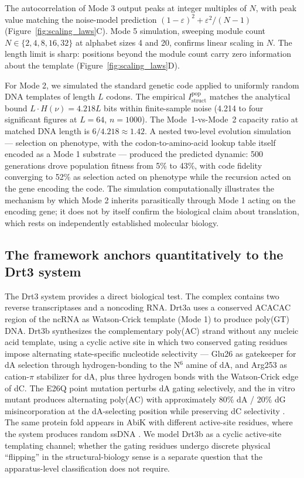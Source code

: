 \documentclass[aps,prx,reprint,amsmath,amssymb,floatfix,superscriptaddress,nofootinbib]{revtex4-2}
\theoremstyle{plain-thm}
\theoremstyle{definition-thm}
\newcommand{\Istructpop}{I_{\mathrm{struct}}^{\mathrm{pop}}}
\begin{document}
The autocorrelation of Mode 3 output peaks at integer multiples of $N$, with peak value matching the noise-model prediction $(1 - \varepsilon)^2 + \varepsilon^2/(N - 1)$ (Figure~\ref{fig:scaling_laws}C). Mode 5 simulation, sweeping module count $N \in \{2, 4, 8, 16, 32\}$ at alphabet sizes 4 and 20, confirms linear scaling in $N$. The length limit is sharp: positions beyond the module count carry zero information about the template (Figure~\ref{fig:scaling_laws}D).

For Mode 2, we simulated the standard genetic code applied to uniformly random DNA templates of length $L$ codons. The empirical $\Istructpop$ matches the analytical bound $L \cdot H(\nu) = 4.218L$ bits within finite-sample noise (4.214 to four significant figures at $L = 64$, $n = 1000$). The Mode~1-vs-Mode~2 capacity ratio at matched DNA length is $6/4.218 \approx 1.42$. A nested two-level evolution simulation --- selection on phenotype, with the codon-to-amino-acid lookup table itself encoded as a Mode 1 substrate --- produced the predicted dynamic: 500 generations drove population fitness from 5\% to 43\%, with code fidelity converging to 52\% as selection acted on phenotype while the recursion acted on the gene encoding the code. The simulation computationally illustrates the mechanism by which Mode 2 inherits parasitically through Mode 1 acting on the encoding gene; it does not by itself confirm the biological claim about translation, which rests on independently established molecular biology.

\subsection{The framework anchors quantitatively to the Drt3 system}

The Drt3 system \citep{Deng2026} provides a direct biological test. The complex contains two reverse transcriptases and a noncoding RNA. Drt3a uses a conserved ACACAC region of the ncRNA as Watson-Crick template (Mode 1) to produce poly(GT) DNA. Drt3b synthesizes the complementary poly(AC) strand without any nucleic acid template, using a cyclic active site in which two conserved gating residues impose alternating state-specific nucleotide selectivity --- Glu26 as gatekeeper for dA selection through hydrogen-bonding to the N$^6$ amine of dA, and Arg253 as cation-$\pi$ stabilizer for dA, plus three hydrogen bonds with the Watson-Crick edge of dC. The E26Q point mutation perturbs dA gating selectively, and the in vitro mutant produces alternating poly(AC) with approximately 80\% dA / 20\% dG misincorporation at the dA-selecting position while preserving dC selectivity \citep[Fig. 4J]{Deng2026}. The same protein fold appears in AbiK with different active-site residues, where the system produces random ssDNA \citep{Deng2026}. We model Drt3b as a cyclic active-site templating channel; whether the gating residues undergo discrete physical ``flipping'' in the structural-biology sense is a separate question that the apparatus-level classification does not require.
\end{document}
